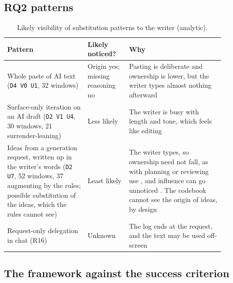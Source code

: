 \documentclass[manuscript,screen]{acmart}
\newcommand{\code}[1]{\texttt{#1}}
\begin{document}
\subsection{RQ2 patterns}

\begin{table}[tbp]
\caption{Likely visibility of substitution patterns to the writer (analytic).}
\label{tab:rq2}
\small
\begin{tabular}{p{0.33\linewidth}p{0.17\linewidth}p{0.39\linewidth}}
\toprule
Pattern & Likely noticed? & Why \\
\midrule
Whole paste of AI text (\code{D4 V0 U1}, 32 windows) & Origin yes; missing reasoning no & Pasting is deliberate and ownership is lower, but the writer types almost nothing afterward \\
Surface-only iteration on an AI draft (\code{D2 V1 U4}, 30 windows, 21 surrender-leaning) & Less likely & The writer is busy with length and tone, which feels like editing \\
Ideas from a generation request, written up in the writer's words (\code{D2 U7}, 52 windows, 37 augmenting by the rules; possible substitution of the ideas, which the rules cannot see) & Least likely & The writer types, so ownership need not fall, as with planning or reviewing use \cite{jelson2026chi}, and influence can go unnoticed \cite{bhat2026}. The codebook cannot see the origin of ideas, by design \\
Request-only delegation in chat (R16) & Unknown & The log ends at the request, and the text may be used off-screen \\
\bottomrule
\end{tabular}
\end{table}

\subsection{The framework against the success criterion}
\end{document}
